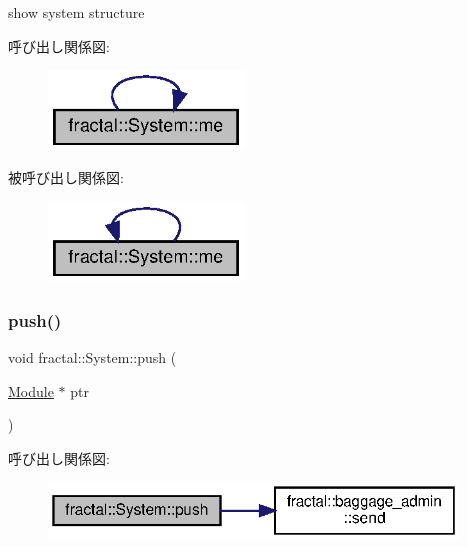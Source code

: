 show system structure 

呼び出し関係図\+:
\nopagebreak
\begin{figure}[H]
\begin{center}
\leavevmode
\includegraphics[width=147pt]{classfractal_1_1System_ae1da12b267d3fe5b811e4130ae888b50_cgraph}
\end{center}
\end{figure}
被呼び出し関係図\+:
\nopagebreak
\begin{figure}[H]
\begin{center}
\leavevmode
\includegraphics[width=147pt]{classfractal_1_1System_ae1da12b267d3fe5b811e4130ae888b50_icgraph}
\end{center}
\end{figure}
\mbox{\label{classfractal_1_1System_a69dd1513fed01dd3cf455763bd243f5e}} 
\subsubsection{\texorpdfstring{push()}{push()}}
{\footnotesize\ttfamily void fractal\+::\+System\+::push (\begin{DoxyParamCaption}\item[{\hyperlink{classfractal_1_1Module}{Module} $\ast$}]{ptr }\end{DoxyParamCaption})\hspace{0.3cm}{\ttfamily [inline]}}

呼び出し関係図\+:
\nopagebreak
\begin{figure}[H]
\begin{center}
\leavevmode
\includegraphics[width=308pt]{classfractal_1_1System_a69dd1513fed01dd3cf455763bd243f5e_cgraph}
\end{center}
\end{figure}
\mbox{\label{classfractal_1_1System_a86fe5dae233bd52be06fe950087787d9}} 
